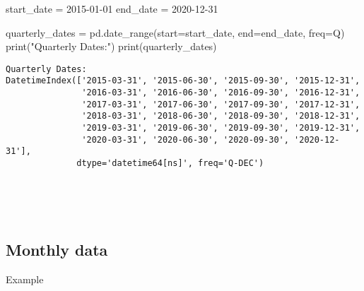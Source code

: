 \documentclass[
  letterpaper,
  DIV=11,
  numbers=noendperiod]{scrreprt}
\newenvironment{Shaded}{\begin{snugshade}}{\end{snugshade}}
\newcommand{\BuiltInTok}[1]{\textcolor[rgb]{0.00,0.23,0.31}{#1}}
\newcommand{\NormalTok}[1]{\textcolor[rgb]{0.00,0.23,0.31}{#1}}
\newcommand{\OperatorTok}[1]{\textcolor[rgb]{0.37,0.37,0.37}{#1}}
\newcommand{\StringTok}[1]{\textcolor[rgb]{0.13,0.47,0.30}{#1}}
\begin{document}
\begin{Shaded}
\begin{Highlighting}[]
\NormalTok{start\_date }\OperatorTok{=} \StringTok{\textquotesingle{}2015{-}01{-}01\textquotesingle{}}
\NormalTok{end\_date }\OperatorTok{=} \StringTok{\textquotesingle{}2020{-}12{-}31\textquotesingle{}}

\NormalTok{quarterly\_dates }\OperatorTok{=}\NormalTok{ pd.date\_range(start}\OperatorTok{=}\NormalTok{start\_date, end}\OperatorTok{=}\NormalTok{end\_date, freq}\OperatorTok{=}\StringTok{\textquotesingle{}Q\textquotesingle{}}\NormalTok{)}
\BuiltInTok{print}\NormalTok{(}\StringTok{"Quarterly Dates:"}\NormalTok{)}
\BuiltInTok{print}\NormalTok{(quarterly\_dates)}
\end{Highlighting}
\end{Shaded}

\begin{verbatim}
Quarterly Dates:
DatetimeIndex(['2015-03-31', '2015-06-30', '2015-09-30', '2015-12-31',
               '2016-03-31', '2016-06-30', '2016-09-30', '2016-12-31',
               '2017-03-31', '2017-06-30', '2017-09-30', '2017-12-31',
               '2018-03-31', '2018-06-30', '2018-09-30', '2018-12-31',
               '2019-03-31', '2019-06-30', '2019-09-30', '2019-12-31',
               '2020-03-31', '2020-06-30', '2020-09-30', '2020-12-31'],
              dtype='datetime64[ns]', freq='Q-DEC')
\end{verbatim}

\begin{verbatim}
\end{verbatim}

\begin{verbatim}
\end{verbatim}

\begin{verbatim}
\end{verbatim}

\begin{verbatim}
\end{verbatim}

\begin{verbatim}
\end{verbatim}

\hypertarget{monthly-data}{%
\subsection{Monthly data}\label{monthly-data}}

Example
\end{document}
